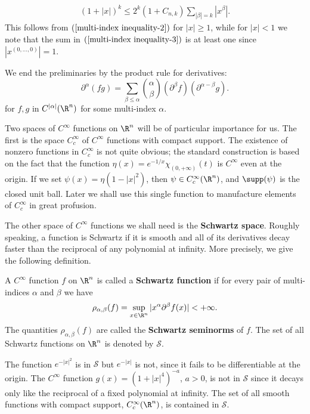\begin{align}\label{multi-index inequality-3}
(1+|x|)^k\leq 2^k(1+C_{n,k})\sum_{|\beta|=k}|x^\beta|.
\end{align}
This follows from $(\ref{multi-index inequality-2})$ for $|x|\geq 1$, while for $|x|<1$ we note that the sum in $(\ref{multi-index inequality-3})$ is at least one since $|x^{(0,\dots,0)}|=1$.\par
We end the preliminaries by the product rule for derivatives:
\[\partial^\alpha(fg)=\sum_{\beta\leq\alpha}\binom{\alpha}{\beta}(\partial^\beta f)(\partial^{\alpha-\beta}g).\]
for $f,g$ in $C^{|\alpha|}(\R^n)$ for some multi-index $\alpha$.\par
Two spaces of $C^\infty$ functions on $\R^n$ will be of particular importance for us. The first is the space $C_c^\infty$ of $C^\infty$ functions with compact support. The existence of nonzero functions in $C_c^\infty$ is not quite obvious; the standard construction is based on the fact that the function $\eta(x)=e^{-1/x}\chi_{(0,+\infty)}(t)$ is $C^\infty$ even at the origin. If we set $\psi(x)=\eta(1-|x|^2)$, then $\psi\in C_c^\infty(\R^n)$, and $\supp(\psi)$ is the closed unit ball. Later we shall use this single function to manufacture elements of $C_c^\infty$ in great profusion.\par
The other space of $C^\infty$ functions we shall need is the \textbf{Schwartz space}. Roughly speaking, a function is Schwartz if it is smooth and all of its derivatives decay faster than the reciprocal of any polynomial at infinity. More precisely, we give the following definition.
\begin{definition}
A $C^\infty$ function $f$ on $\R^n$ is called a \textbf{Schwartz function} if for every pair of multi-indices $\alpha$ and $\beta$ we have
\[\rho_{\alpha,\beta}(f)=\sup_{x\in\R^n}|x^\alpha\partial^\beta f(x)|<+\infty.\]
The quantities $\rho_{\alpha,\beta}(f)$ are called the \textbf{Schwartz seminorms} of $f$. The set of all Schwartz functions on $\R^n$ is denoted by $\mathscr{S}$.
\end{definition}
\begin{example}
The function $e^{-|x|^2}$ is in $\mathscr{S}$ but $e^{-|x|}$ is not, since it fails to be differentiable at the origin. The $C^\infty$ function $g(x)=(1+|x|^4)^{-a}$, $a>0$, is not in $\mathscr{S}$ since it decays only like the reciprocal of a fixed polynomial at infinity. The set of all smooth functions with compact support, $C_c^{\infty}(\R^n)$, is contained in $\mathscr{S}$.
\end{example}
